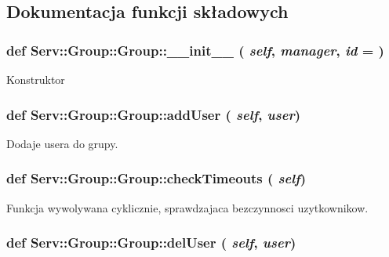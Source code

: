 \subsection{Dokumentacja funkcji składowych}
\hypertarget{class_serv_1_1_group_1_1_group_aee5bd24c2c39d9c06c11aec410690c3d}{
\subsubsection[{\_\-\_\-init\_\-\_\-}]{\setlength{\rightskip}{0pt plus 5cm}def Serv::Group::Group::\_\-\_\-init\_\-\_\- ( {\em self}, \/   {\em manager}, \/   {\em id} = {})}}
\label{class_serv_1_1_group_1_1_group_aee5bd24c2c39d9c06c11aec410690c3d}
\begin{DoxyVerb}Konstruktor\end{DoxyVerb}
 \hypertarget{class_serv_1_1_group_1_1_group_a0a4183d2362794bd55741a35e4b5a91d}{
\subsubsection[{addUser}]{\setlength{\rightskip}{0pt plus 5cm}def Serv::Group::Group::addUser ( {\em self}, \/   {\em user})}}
\label{class_serv_1_1_group_1_1_group_a0a4183d2362794bd55741a35e4b5a91d}
\begin{DoxyVerb}Dodaje usera do grupy.\end{DoxyVerb}
 \hypertarget{class_serv_1_1_group_1_1_group_aff52dadf0f67e54340f9602cc3a6fbba}{
\subsubsection[{checkTimeouts}]{\setlength{\rightskip}{0pt plus 5cm}def Serv::Group::Group::checkTimeouts ( {\em self})}}
\label{class_serv_1_1_group_1_1_group_aff52dadf0f67e54340f9602cc3a6fbba}
\begin{DoxyVerb}Funkcja wywolywana cyklicznie, sprawdzajaca bezczynnosci uzytkownikow.\end{DoxyVerb}
 \hypertarget{class_serv_1_1_group_1_1_group_a48768b6b5440e56d42d632085b2a8aef}{
\subsubsection[{delUser}]{\setlength{\rightskip}{0pt plus 5cm}def Serv::Group::Group::delUser ( {\em self}, \/   {\em user})}}
